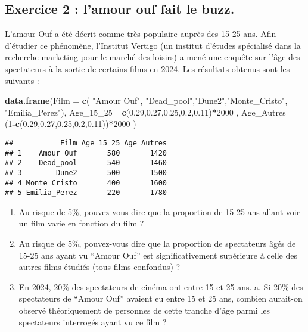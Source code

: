 \documentclass[
]{article}
\newenvironment{Shaded}{\begin{snugshade}}{\end{snugshade}}
\newcommand{\AttributeTok}[1]{\textcolor[rgb]{0.13,0.29,0.53}{#1}}
\newcommand{\DecValTok}[1]{\textcolor[rgb]{0.00,0.00,0.81}{#1}}
\newcommand{\FloatTok}[1]{\textcolor[rgb]{0.00,0.00,0.81}{#1}}
\newcommand{\FunctionTok}[1]{\textcolor[rgb]{0.13,0.29,0.53}{\textbf{#1}}}
\newcommand{\NormalTok}[1]{#1}
\newcommand{\SpecialCharTok}[1]{\textcolor[rgb]{0.81,0.36,0.00}{\textbf{#1}}}
\newcommand{\StringTok}[1]{\textcolor[rgb]{0.31,0.60,0.02}{#1}}
\begin{document}
\hypertarget{exercice-2-lamour-ouf-fait-le-buzz.}{%
\subsection{Exercice 2 : l'amour ouf fait le
buzz.}\label{exercice-2-lamour-ouf-fait-le-buzz.}}

L'amour Ouf a été décrit comme très populaire auprès des 15-25 ans. Afin
d'étudier ce phénomène, l'Institut Vertigo (un institut d'études
spécialisé dans la recherche marketing pour le marché des loisirs) a
mené une enquête sur l'âge des spectateurs à la sortie de certains films
en 2024. Les résultats obtenus sont les suivants :

\begin{Shaded}
\begin{Highlighting}[]
\FunctionTok{data.frame}\NormalTok{(}\AttributeTok{Film =} \FunctionTok{c}\NormalTok{( }\StringTok{"Amour Ouf"}\NormalTok{, }\StringTok{"Dead\_pool"}\NormalTok{,}\StringTok{"Dune2"}\NormalTok{,}\StringTok{"Monte\_Cristo"}\NormalTok{, }\StringTok{"Emilia\_Perez"}\NormalTok{), }\AttributeTok{Age\_15\_25=} \FunctionTok{c}\NormalTok{(}\FloatTok{0.29}\NormalTok{,}\FloatTok{0.27}\NormalTok{,}\FloatTok{0.25}\NormalTok{,}\FloatTok{0.2}\NormalTok{,}\FloatTok{0.11}\NormalTok{)}\SpecialCharTok{*}\DecValTok{2000}\NormalTok{ , }\AttributeTok{Age\_Autres =}\NormalTok{ (}\DecValTok{1}\SpecialCharTok{{-}}\FunctionTok{c}\NormalTok{(}\FloatTok{0.29}\NormalTok{,}\FloatTok{0.27}\NormalTok{,}\FloatTok{0.25}\NormalTok{,}\FloatTok{0.2}\NormalTok{,}\FloatTok{0.11}\NormalTok{))}\SpecialCharTok{*}\DecValTok{2000}\NormalTok{ )}
\end{Highlighting}
\end{Shaded}

\begin{verbatim}
##           Film Age_15_25 Age_Autres
## 1    Amour Ouf       580       1420
## 2    Dead_pool       540       1460
## 3        Dune2       500       1500
## 4 Monte_Cristo       400       1600
## 5 Emilia_Perez       220       1780
\end{verbatim}

\begin{enumerate}
\def\labelenumi{\arabic{enumi}.}
\item
  Au risque de 5\%, pouvez-vous dire que la proportion de 15-25 ans
  allant voir un film varie en fonction du film ?
\item
  Au risque de 5\%, pouvez-vous dire que la proportion de spectateurs
  âgés de 15-25 ans ayant vu ``Amour Ouf'' est significativement
  supérieure à celle des autres films étudiés (tous films confondus) ?
\item
  En 2024, 20\% des spectateurs de cinéma ont entre 15 et 25 ans. a. Si
  20\% des spectateurs de ``Amour Ouf'' avaient eu entre 15 et 25 ans,
  combien aurait-on observé théoriquement de personnes de cette tranche
  d'âge parmi les spectateurs interrogés ayant vu ce film ?
\end{enumerate}
\end{document}
